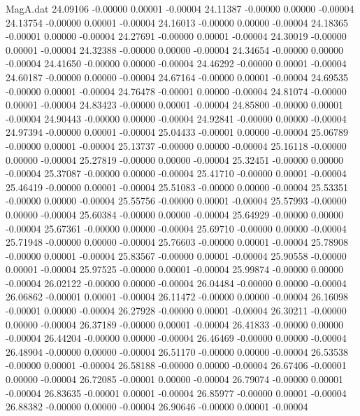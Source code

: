 \begin{filecontents}{MagA.dat}
  24.09106   -0.00000    0.00001   -0.00004
  24.11387   -0.00000    0.00000   -0.00004
  24.13754   -0.00000    0.00001   -0.00004
  24.16013   -0.00000    0.00000   -0.00004
  24.18365   -0.00001    0.00000   -0.00004
  24.27691   -0.00000    0.00001   -0.00004
  24.30019   -0.00000    0.00001   -0.00004
  24.32388   -0.00000    0.00000   -0.00004
  24.34654   -0.00000    0.00000   -0.00004
  24.41650   -0.00000    0.00000   -0.00004
  24.46292   -0.00000    0.00001   -0.00004
  24.60187   -0.00000    0.00000   -0.00004
  24.67164   -0.00000    0.00001   -0.00004
  24.69535   -0.00000    0.00001   -0.00004
  24.76478   -0.00001    0.00000   -0.00004
  24.81074   -0.00000    0.00001   -0.00004
  24.83423   -0.00000    0.00001   -0.00004
  24.85800   -0.00000    0.00001   -0.00004
  24.90443   -0.00000    0.00000   -0.00004
  24.92841   -0.00000    0.00000   -0.00004
  24.97394   -0.00000    0.00001   -0.00004
  25.04433   -0.00001    0.00000   -0.00004
  25.06789   -0.00000    0.00001   -0.00004
  25.13737   -0.00000    0.00000   -0.00004
  25.16118   -0.00000    0.00000   -0.00004
  25.27819   -0.00000    0.00000   -0.00004
  25.32451   -0.00000    0.00000   -0.00004
  25.37087   -0.00000    0.00000   -0.00004
  25.41710   -0.00000    0.00001   -0.00004
  25.46419   -0.00000    0.00001   -0.00004
  25.51083   -0.00000    0.00000   -0.00004
  25.53351   -0.00000    0.00000   -0.00004
  25.55756   -0.00000    0.00001   -0.00004
  25.57993   -0.00000    0.00000   -0.00004
  25.60384   -0.00000    0.00000   -0.00004
  25.64929   -0.00000    0.00000   -0.00004
  25.67361   -0.00000    0.00000   -0.00004
  25.69710   -0.00000    0.00000   -0.00004
  25.71948   -0.00000    0.00000   -0.00004
  25.76603   -0.00000    0.00001   -0.00004
  25.78908   -0.00000    0.00001   -0.00004
  25.83567   -0.00000    0.00001   -0.00004
  25.90558   -0.00000    0.00001   -0.00004
  25.97525   -0.00000    0.00001   -0.00004
  25.99874   -0.00000    0.00000   -0.00004
  26.02122   -0.00000    0.00000   -0.00004
  26.04484   -0.00000    0.00000   -0.00004
  26.06862   -0.00001    0.00001   -0.00004
  26.11472   -0.00000    0.00000   -0.00004
  26.16098   -0.00001    0.00000   -0.00004
  26.27928   -0.00000    0.00001   -0.00004
  26.30211   -0.00000    0.00000   -0.00004
  26.37189   -0.00000    0.00001   -0.00004
  26.41833   -0.00000    0.00000   -0.00004
  26.44204   -0.00000    0.00000   -0.00004
  26.46469   -0.00000    0.00000   -0.00004
  26.48904   -0.00000    0.00000   -0.00004
  26.51170   -0.00000    0.00000   -0.00004
  26.53538   -0.00000    0.00001   -0.00004
  26.58188   -0.00000    0.00000   -0.00004
  26.67406   -0.00001    0.00000   -0.00004
  26.72085   -0.00001    0.00000   -0.00004
  26.79074   -0.00000    0.00001   -0.00004
  26.83635   -0.00001    0.00001   -0.00004
  26.85977   -0.00000    0.00001   -0.00004
  26.88382   -0.00000    0.00000   -0.00004
  26.90646   -0.00000    0.00001   -0.00004
\end{filecontents}
